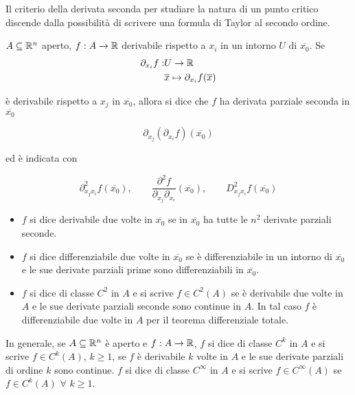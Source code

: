Il criterio della derivata seconda per studiare la natura di un punto critico discende dalla possibilità di scrivere una formula di Taylor al secondo ordine.


\begin{definition}
	$A \subseteq \mathbb{R}^n$ aperto, $f: A \rightarrow \mathbb{R}$ derivabile rispetto a $x_i$ in un intorno $U$ di $\overline{x_0}$. Se 
	\begin{align*} 
		\partial_{x_i}f: &U\rightarrow \mathbb{R}
		\\
		&\overline{x} \mapsto \partial_{x_i}f(\overline{x})
	\end{align*}
	
	è derivabile rispetto a $x_j$ in $\overline{x_0}$, allora si dice che $f$ ha derivata parziale seconda in $\overline{x_0}$
	
	$$\partial_{x_j}(\partial_{x_i}f)(\overline{x_0})$$
	
	ed è indicata con 
	
	$$\partial_{x_jx_i}^2f(\overline{x_0}), \qquad \frac{\partial^2 f}{\partial_{x_j}\partial_{x_i}}(\overline{x_0}), \qquad D_{x_jx_i}^2f(\overline{x_0})$$
	
	\begin{itemize}
		\item $f$ si dice derivabile due volte in $\overline{x_0} $ se in $\overline{x_0}$ ha tutte le $n^2$ derivate parziali seconde.
		
		\item $f$ si dice differenziabile due volte in $\overline{x_0}$ se è differenziabile in un intorno di $\overline{x_0}$ e le sue derivate parziali prime sono differenziabili in $\overline{x_0}$.
		
		\item $f$ si dice di classe $C^2$ in $A$ e si scrive $f \in C^2(A)$ se è derivabile due volte in $A$ e le sue derivate parziali seconde sono continue in $A$. In tal caso $f$ è differenziabile due volte in $A$ per il teorema differenziale totale. 
	\end{itemize}
\end{definition}


\begin{definition}
	In generale, se $A \subseteq \mathbb{R}^n$ è aperto e $f:A\rightarrow\mathbb{R}$, $f$ si dice di classe $C^k$ in $A$ e si scrive $f \in C^k(A)$, $k \geq 1$, se $f$ è derivabile $k$ volte in $A$ e le sue derivate parziali di ordine $k$ sono continue. $f$ si dice di classe $C^\infty$ in $A$ e si scrive $f \in C^\infty(A)$ se $f\in C^k(A) \,\, \forall \,\, k \geq 1$.
\end{definition}


